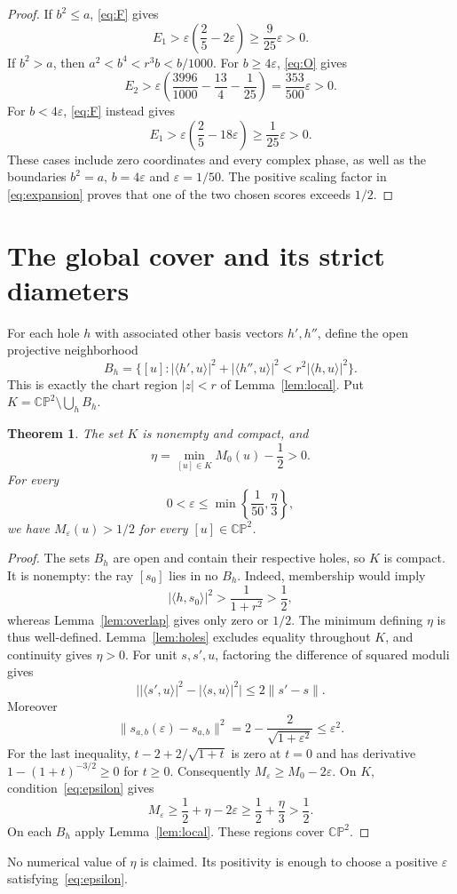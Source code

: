 \documentclass[11pt,a4paper]{article}
\newtheorem{theorem}{Theorem}[section]
\theoremstyle{remark}
\numberwithin{equation}{section}
\newcommand{\CP}{\mathbb{CP}}
\newcommand{\ip}[2]{\langle #1,#2\rangle}
\newcommand{\norm}[1]{\lVert #1\rVert}
\begin{document}
\begin{proof}
If $b^2\le a$, \eqref{eq:F} gives
\[
 E_1>\varepsilon\left(\frac25-2\varepsilon\right)
 \ge\frac9{25}\varepsilon>0.
\]
If $b^2>a$, then $a^2<b^4<r^3b<b/1000$. For $b\ge4\varepsilon$, \eqref{eq:O} gives
\[
 E_2>\varepsilon\left(\frac{3996}{1000}-\frac{13}4-\frac1{25}\right)
 =\frac{353}{500}\varepsilon>0.
\]
For $b<4\varepsilon$, \eqref{eq:F} instead gives
\[
 E_1>\varepsilon\left(\frac25-18\varepsilon\right)
 \ge\frac1{25}\varepsilon>0.
\]
These cases include zero coordinates and every complex phase, as well as the boundaries $b^2=a$, $b=4\varepsilon$ and $\varepsilon=1/50$. The positive scaling factor in \eqref{eq:expansion} proves that one of the two chosen scores exceeds $1/2$.
\end{proof}

\section{The global cover and its strict diameters}
For each hole $h$ with associated other basis vectors $h',h''$, define the open projective neighborhood
\[
 B_h=\{[u]:|\ip{h'}u|^2+|\ip{h''}u|^2<r^2|\ip hu|^2\}.
\]
This is exactly the chart region $|z|<r$ of Lemma~\ref{lem:local}. Put $K=\CP^2\setminus\bigcup_hB_h$.

\begin{theorem}\label{thm:uniform}
The set $K$ is nonempty and compact, and
\[
 \eta=\min_{[u]\in K}M_0(u)-\frac12>0.
\]
For every
\begin{equation}\label{eq:epsilon}
 0<\varepsilon\le\min\left\{\frac1{50},\frac\eta3\right\},
\end{equation}
we have $M_\varepsilon(u)>1/2$ for every $[u]\in\CP^2$.
\end{theorem}
\begin{proof}
The sets $B_h$ are open and contain their respective holes, so $K$ is compact. It is nonempty: the ray $[s_0]$ lies in no $B_h$. Indeed, membership would imply
\[
 |\ip h{s_0}|^2>\frac1{1+r^2}>\frac12,
\]
whereas Lemma~\ref{lem:overlap} gives only zero or $1/2$. The minimum defining $\eta$ is thus well-defined. Lemma~\ref{lem:holes} excludes equality throughout $K$, and continuity gives $\eta>0$.
For unit $s,s',u$, factoring the difference of squared moduli gives
\[
 \big||\ip{s'}u|^2-|\ip su|^2\big|\le2\norm{s'-s}.
\]
Moreover
\[
 \norm{s_{a,b}(\varepsilon)-s_{a,b}}^2
 =2-\frac2{\sqrt{1+\varepsilon^2}}\le\varepsilon^2.
\]
For the last inequality, $t-2+2/\sqrt{1+t}$ is zero at $t=0$ and has derivative $1-(1+t)^{-3/2}\ge0$ for $t\ge0$. Consequently $M_\varepsilon\ge M_0-2\varepsilon$. On $K$, condition~\eqref{eq:epsilon} gives
\[
 M_\varepsilon\ge\frac12+\eta-2\varepsilon\ge\frac12+\frac\eta3>\frac12.
\]
On each $B_h$ apply Lemma~\ref{lem:local}. These regions cover $\CP^2$.
\end{proof}
No numerical value of $\eta$ is claimed. Its positivity is enough to choose a positive $\varepsilon$ satisfying~\eqref{eq:epsilon}.
\end{document}

